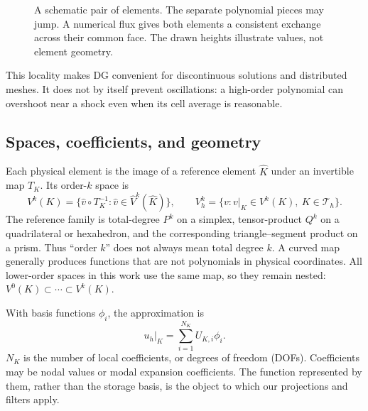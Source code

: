 \begin{figure}[htbp]
\centering
{}
\caption{A schematic pair of elements. The separate polynomial pieces may
jump. A numerical flux gives both elements a consistent exchange across their
common face. The drawn heights illustrate values, not element geometry.}
\label{fig:dg-traces}
\end{figure}

This locality makes DG convenient for discontinuous solutions and distributed
meshes. It does not by itself prevent oscillations: a high-order polynomial
can overshoot near a shock even when its cell average is reasonable.

\subsection{Spaces, coefficients, and geometry}
Each physical element is the image of a reference element $\widehat K$ under
an invertible map $T_K$. Its order-$k$ space is
\begin{equation}
 V^k(K)=\{\widehat v\circ T_K^{-1}:\widehat v\in\widehat V^k(\widehat K)\},
 \qquad V_h^k=\{v:v|_K\in V^k(K),\ K\in\mathcal T_h\}.
 \label{eq:ofdg-space}
\end{equation}
The reference family is total-degree $P^k$ on a simplex, tensor-product $Q^k$
on a quadrilateral or hexahedron, and the corresponding triangle--segment
product on a prism. Thus ``order $k$'' does not always mean total degree $k$.
A curved map generally produces functions that are not polynomials in physical
coordinates. All lower-order spaces in this work use the same map, so they
remain nested: $V^0(K)\subset\cdots\subset V^k(K)$.

With basis functions $\phi_i$, the approximation is
\begin{equation}
 u_h|_K=\sum_{i=1}^{N_K}U_{K,i}\phi_i.
 \label{eq:ofdg-local-expansion}
\end{equation}
$N_K$ is the number of local coefficients, or degrees of freedom (DOFs).
Coefficients may be nodal values or modal expansion coefficients. The function
represented by them, rather than the storage basis, is the object to which
our projections and filters apply.

